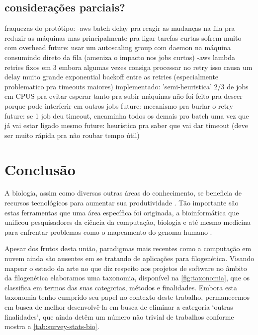 \documentclass[english,brazilian]{UNISINOSmonografia} %
\begin{document}
\section{considerações parciais?}

fraquezas do protótipo:
	-aws batch
		delay pra reagir as mudanças na fila
		pra reduzir as máquinas
		mas principalmente pra ligar
		tarefas curtas sofrem muito com overhead
		future: usar um autoscaling group com daemon na máquina consumindo direto da fila (ameniza o impacto nos jobs curtos)
	-aws lambda
		retries fixos em 3
		embora algumas vezes consiga processar no retry isso causa um delay muito grande
		exponential backoff entre as retries (especialmente problematico pra timeouts maiores)
		implementado: 'semi-heuristica' 2/3 de jobs em CPUS pra evitar esperar tanto pra subir máquinas
		não foi feito pra descer porque pode interferir em outros jobs
		future: mecanismo pra burlar o retry
		future: se 1 job deu timeout, encaminha todos os demais pro batch uma vez que já vai estar ligado mesmo
		future: heurística pra saber que vai dar timeout (deve ser muito rápida pra não roubar tempo útil)

\chapter{Conclusão}
\label{ch:conclusao}



A biologia, assim como diversas outras áreas do conhecimento, se beneficia de recursos tecnológicos para aumentar sua produtividade \cite{Denning2009}.
Tão importante são estas ferramentas que uma área específica foi originada, a bioinformática que unificou pesquisadores da ciência da computação, biologia e até mesmo medicina para enfrentar problemas como o mapeamento do genoma humano \cite{Venter2001}.


Apesar dos frutos desta união, paradigmas mais recentes como a computação em nuvem ainda são ausentes em se tratando de aplicações para filogenética.
Visando mapear o estado da arte no que diz respeito aos projetos de software no âmbito da filogenética elaboramos uma taxonomia, disponível na \autoref{fig:taxonomia}, que os classifica em termos das suas categorias, métodos e finalidades.
Embora esta taxonomia tenho cumprido seu papel no contexto deste trabalho, permanecemos em busca de melhor desenvolvê-la em busca de eliminar a categoria \textquoteleft outras finalidades\textquoteright, que ainda detêm um número não trivial de trabalhos conforme mostra a \autoref{tab:survey-stats-bio}.
\end{document}

